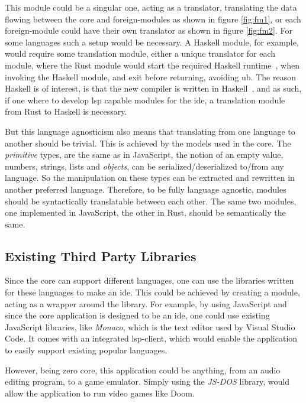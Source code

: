 This module could be a singular one, acting as a translator, translating the
data flowing between the core and foreign-modules as shown in figure
\ref{fig:fm1}, or each foreign-module could have their own translator as shown
in figure \ref{fig:fm2}. For some languages such a setup would be necessary.
A Haskell module, for example, would require some translation module, either a
unique translator for each module, where the Rust module would start the
required Haskell runtime~\cite{ghcRts}, when invoking the Haskell module, and
exit before returning, avoiding \gls*{ub}. The reason Haskell is of interest,
is that the new compiler is written in Haskell~\cite{wiig}, and as such, if one
where to develop \gls*{lsp} capable modules for the \gls*{ide}, a translation
module from Rust to Haskell is necessary.


But this language agnosticism also means that translating from one language to
another should be trivial. This is achieved by the models used in the core. The
\textit{primitive} types, are the same as in JavaScript, the notion of an empty
value, numbers, strings, lists and \textit{objects}, can be
serialized/deserialized to/from any language. So the manipulation on these types
can be extracted and rewritten in another preferred language. Therefore, to be
fully language agnostic, modules should be syntactically translatable between
each other. The same two modules, one implemented in JavaScript, the other in
Rust, should be semantically the same.

\subsection{Existing Third Party Libraries}

Since the core can support different languages, one can use the libraries
written for these languages to make an \gls*{ide}. This could be achieved by
creating a module, acting as a wrapper around the library. For example, by
using JavaScript and since the core application is designed to be an \gls*{ide},
one could use existing JavaScript libraries, like \textit{Monaco}, which is the
text editor used by Visual Studio Code. It comes with an integrated
\gls*{lsp}-client, which would enable the application to easily support existing
popular languages.

However, being zero core, this application could be anything, from an audio
editing program, to a game emulator. Simply using the \textit{JS-DOS} library,
would allow the application to run video games like Doom.

